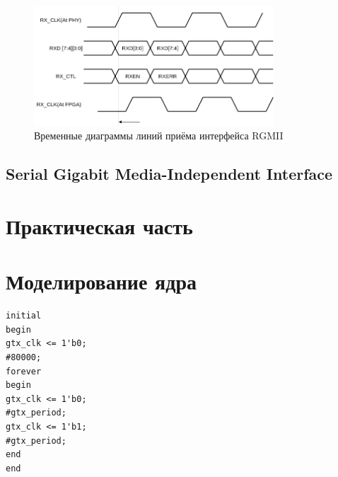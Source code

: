 \begin{figure}[!ht]
	\centering
	\includegraphics[width=0.8\textwidth]{image/RX_RGMII}
	\caption{Временные диаграммы линий приёма интерфейса RGMII}
	\label{TX_RGMII}
\end{figure}

\subsection{Serial Gigabit Media-Independent Interface}

\section{Практическая часть}

\section{Моделирование ядра}

\begin{Verbatim}[tabsize=4]
initial
begin
gtx_clk <= 1'b0;
#80000;
forever
begin
gtx_clk <= 1'b0;
#gtx_period;
gtx_clk <= 1'b1;
#gtx_period;
end
end
\end{Verbatim}

